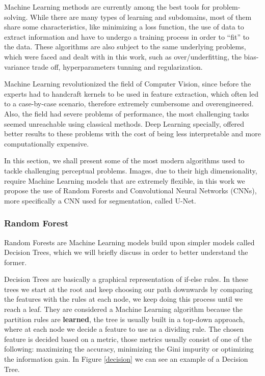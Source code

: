 Machine Learning methods are currently among the best tools for problem-solving. While there are many types of learning and subdomains, most of them share some characteristics, like minimizing a loss function, the use of data to extract information and have to undergo a training process in order to ``fit'' to the data. These algorithms are also subject to the same underlying problems, which were faced and dealt with in this work, such as over/underfitting, the bias-variance trade off, hyperparameters tunning and regularization.

Machine Learning revolutionized the field of Computer Vision, since before the experts had to handcraft kernels to be used in feature extraction, which often led to a case-by-case scenario, therefore  extremely cumbersome and overengineered. Also, the field had severe problems of performance, the most challenging tasks seemed unreachable using classical methods. Deep Learning specially, offered better results to these problems with the cost of being less interpretable and more computationally expensive. 

In this section, we shall present some of the most modern algorithms used to tackle challenging perceptual problems. Images, due to their high dimensionality, require Machine Learning models that are extremely flexible, in this work we propose the use of Random Forests and Convolutional Neural Networks (CNNs), more specifically a CNN used for segmentation, called U-Net.

\subsubsection{Random Forest}

Random Forests are Machine Learning models build upon simpler models called Decision Trees, which we will briefly discuss in order to better understand the former. 

Decision Trees are basically a graphical representation of if-else rules. In these trees we start at the root and keep choosing our path downwards by comparing the features with the rules at each node, we keep doing this process until we reach a leaf. They are considered a Machine Learning algorithm because the partition rules are \textbf{learned}, the tree is usually built in a top-down approach, where at each node we decide a feature to use as a dividing rule. The chosen feature is decided based on a metric, those metrics usually consist of one of the following: maximizing the accuracy, minimizing the Gini impurity or optimizing the information gain. In Figure \ref{decision} we can see an example of a Decision Tree.

